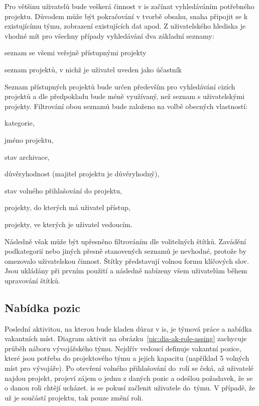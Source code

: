 Pro většinu uživatelů bude veškerá činnost v \gls{is} začínat vyhledáváním potřebného projektu. Důvodem může být pokračování v tvorbě obsahu, snaha připojit se k existujícímu týmu, zobrazení existujících dat apod. Z uživatelského hlediska je vhodné mít pro všechny případy vyhledávání dva základní seznamy:

\begin{ulnar}
   \item seznam se všemi veřejně přístupnými projekty
   \item seznam projektů, v nichž je uživatel uveden jako účastník
\end{ulnar}

Seznam přístupných projektů bude určen především pro vyhledávání cizích projektů a dle předpokladu bude méně využívaný, než seznam s uživatelskými projekty. Filtrování obou seznamů bude založeno na volbě obecných vlastností:

\begin{ulnar}
   \item kategorie,
   \item jméno projektu,
   \item stav archivace,
   \item důvěryhodnost (majitel projektu je důvěryhodný),
   \item stav volného přihlašování do projektu,
   \item projekty, do kterých má uživatel přístup,
   \item projekty, ve kterých je uživatel vedoucím.
\end{ulnar}

Následně však může být upřesněno filtrováním dle volitelných štítků. Zavádění podkategorií nebo jiných přesně stanovených seznamů je nevhodné, protože by omezovalo uživatelskou činnost. Štítky představují volnou formu klíčových slov. Jsou ukládány při prvním použití a následně nabízeny všem uživatelům během upravování štítků.





\subsection{Nabídka pozic}

Poslední aktivitou, na kterou bude kladen důraz v \gls{is}, je týmová práce a nabídka vakantních míst. Diagram aktivit na obrázku~\ref{pic:dia-ak-role-assing} zachycuje průběh náboru vývojářského týmu. Nejdřív vedoucí definuje vakantní pozice, které jsou potřeba do projektového týmu a jejich kapacitu (například 5 volných míst pro vývojáře). Po otevření volného přihlašování do~rolí se čeká, až uživatelé najdou projekt, projeví zájem o jednu z daných pozic a odešlou požadavek, že se o danou roli chtějí ucházet. \gls{is} se pokusí začlenit uživatele do~týmu. V případě, že už je součástí projektu, tak pouze změní roli.


